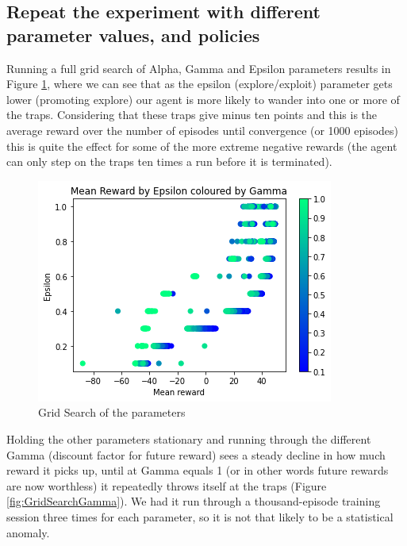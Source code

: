\documentclass[a4pape, 11pt, english]{article}
\begin{document}
\subsection{Repeat the experiment with different parameter values, and policies}
Running a full grid search of Alpha, Gamma and Epsilon parameters results in Figure \ref{fig:GridSearchColorGamma}, where we can see that as the epsilon (explore/exploit) parameter gets lower (promoting explore) our agent is more likely to wander into one or more of the traps. Considering that these traps give minus ten points and this is the average reward over the number of episodes until convergence (or 1000 episodes) this is quite the effect for some of the more extreme negative rewards (the agent can only step on the traps ten times a run before it is terminated).

\begin{figure}[h!]
	\begin{center}
		\includegraphics[scale=0.8]{img/GridSearchRewardEpsilonGamma.png}
		\caption{Grid Search of the parameters}
		\label{fig:GridSearchColorGamma}
	\end{center}
\end{figure}

Holding the other parameters stationary and running through the different Gamma (discount factor for future reward) sees a steady decline in how much reward it picks up, until at Gamma equals 1 (or in other words future rewards are now worthless) it repeatedly throws itself at the traps (Figure \ref{fig:GridSearchGamma}). We had it run through a thousand-episode training session three times for each parameter, so it is not that likely to be a statistical anomaly.
\end{document}
